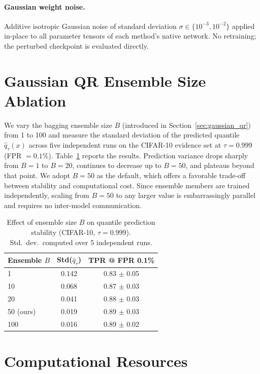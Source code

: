 \documentclass{article}
\begin{document}
\paragraph{Gaussian weight noise.} Additive isotropic Gaussian noise of standard deviation $\sigma \in \{10^{-3}, 10^{-2}\}$ applied in-place to all parameter tensors of each method's native network. No retraining; the perturbed checkpoint is evaluated directly.

\section{Gaussian QR Ensemble Size Ablation}
\label{app:ablation}

We vary the bagging ensemble size $B$ (introduced in Section~\ref{sec:gaussian_qr}) from 1 to 100 and measure the standard deviation of the predicted quantile $\hat{q}_\tau(x)$ across five independent runs on the CIFAR-10 evidence set at $\tau = 0.999$ (FPR $= 0.1\%$). Table~\ref{tab:ensemble_ablation} reports the results. Prediction variance drops sharply from $B = 1$ to $B = 20$, continues to decrease up to $B = 50$, and plateaus beyond that point. We adopt $B = 50$ as the default, which offers a favorable trade-off between stability and computational cost. Since ensemble members are trained independently, scaling from $B = 50$ to any larger value is embarrassingly parallel and requires no inter-model communication.

\begin{table}[!htbp]
\caption{Effect of ensemble size $B$ on quantile prediction stability (CIFAR-10, $\tau = 0.999$). Std.\ dev.\ computed over 5 independent runs.}
\label{tab:ensemble_ablation}
\centering
\begin{small}
\begin{tabular}{lcc}
\toprule
Ensemble $B$ & Std($\hat{q}_\tau$) & TPR @ FPR 0.1\% \\
\midrule
1 & 0.142 & 0.83 $\pm$ 0.05 \\
10 & 0.068 & 0.87 $\pm$ 0.03 \\
20 & 0.041 & 0.88 $\pm$ 0.03 \\
50 (ours) & 0.019 & 0.89 $\pm$ 0.03 \\
100 & 0.016 & 0.89 $\pm$ 0.02 \\
\bottomrule
\end{tabular}
\end{small}
\end{table}

\section{Computational Resources}
\label{app:cost}
\end{document}
